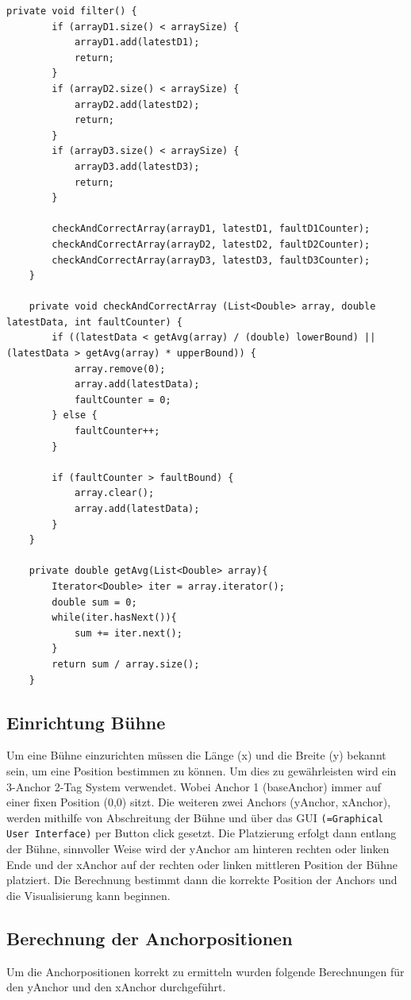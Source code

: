 \begin{lstlisting}[style=Java, caption=Kalibrierung der Daten, captionpos=b]
	private void filter() {
		if (arrayD1.size() < arraySize) {
			arrayD1.add(latestD1);
			return;
		}
		if (arrayD2.size() < arraySize) {
			arrayD2.add(latestD2);
			return;
		}
		if (arrayD3.size() < arraySize) {
			arrayD3.add(latestD3);
			return;
		}
		
		checkAndCorrectArray(arrayD1, latestD1, faultD1Counter);
		checkAndCorrectArray(arrayD2, latestD2, faultD2Counter);
		checkAndCorrectArray(arrayD3, latestD3, faultD3Counter);
	}
	
	private void checkAndCorrectArray (List<Double> array, double latestData, int faultCounter) {
		if ((latestData < getAvg(array) / (double) lowerBound) || (latestData > getAvg(array) * upperBound)) {
			array.remove(0);
			array.add(latestData);
			faultCounter = 0;
		} else {
			faultCounter++;
		}
		
		if (faultCounter > faultBound) {
			array.clear();
			array.add(latestData);
		}
	}
	
	private double getAvg(List<Double> array){
		Iterator<Double> iter = array.iterator();
		double sum = 0;
		while(iter.hasNext()){
			sum += iter.next();
		}
		return sum / array.size();
	}
\end{lstlisting}


\subsection{Einrichtung Bühne}
\label{Einrichtung Bühne}
Um eine Bühne einzurichten müssen die Länge (x) und die Breite (y) bekannt sein, um eine Position bestimmen zu können. Um dies zu gewährleisten wird ein 3-Anchor 2-Tag System verwendet. Wobei Anchor 1 (baseAnchor) immer auf einer fixen Position (0,0) sitzt. Die weiteren zwei Anchors (yAnchor, xAnchor), werden mithilfe von Abschreitung der Bühne und über das GUI \texttt{(=Graphical User Interface)} per Button click gesetzt. Die Platzierung erfolgt dann entlang der Bühne, sinnvoller Weise wird der yAnchor am hinteren rechten oder linken Ende und der xAnchor auf der rechten oder linken mittleren Position der Bühne platziert. Die Berechnung bestimmt dann die korrekte Position der Anchors und die Visualisierung kann beginnen. 

\subsection{Berechnung der Anchorpositionen}
Um die Anchorpositionen korrekt zu ermitteln wurden folgende Berechnungen für den yAnchor und den xAnchor durchgeführt.

